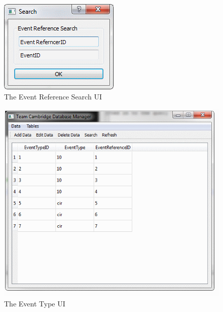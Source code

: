 \begin{figure}
\includegraphics[width=\textwidth]{./Maintenance/UI/EventRefSearch.png}
\caption{The Event Reference Search UI} \label{fig:EventRefSearch_UI}
\end{figure}

\begin{figure}
\includegraphics[width=\textwidth]{./Maintenance/UI/EventType.png}
\caption{The Event Type UI} \label{fig:EventType_UI}
\end{figure}

